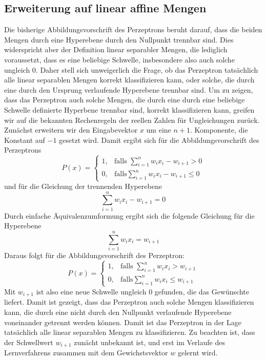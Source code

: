 \documentclass[fontsize=11pt]{scrartcl}
\begin{document}
            \subsection{Erweiterung auf linear affine Mengen}
                Die bisherige Abbildungsvorschrift des Perzeptrons beruht darauf, dass die beiden Mengen durch eine Hyperebene durch den Nullpunkt trennbar sind. Dies widerspricht aber der Definition linear separabler Mengen, die lediglich voraussetzt, dass es eine beliebige Schwelle, insbesondere also auch solche ungleich $0$. Daher stell sich unweigerlich die Frage, ob das Perzeptron tatsächlich alle linear separablen Mengen korrekt klassifizieren kann, oder solche, die durch eine durch den Ursprung verlaufende Hyperebene trennbar sind. Um zu zeigen, dass das Perzeptron auch solche Mengen, die durch eine durch eine beliebige Schwelle definierte Hyperbene trennbar sind, korrekt klassifizieren kann, greifen wir auf die bekannten Rechenregeln der reellen Zahlen für Ungleichungen zurück.
                Zunächst erweitern wir den Eingabevektor $x$ um eine $n+1$. Komponente, die Konstant auf $-1$ gesetzt wird.
                \newline 
                Damit ergibt sich für die Abbildungsvorschrift des Perzeptrons 
                $$
                    P(x)=\left\{\begin{array}{cl} 1, & \mbox{falls }\sum_{i=1}^nw_ix_i - w_{i+1} > 0\\ 0, & \mbox{falls} \sum_{i=1}^n w_ix_i - w_{i+1} \leq 0 \end{array}\right. 
                $$
                und für die Gleichung der trennenden Hyperebene
                $$
                    \sum_{i=1}^nw_ix_i - w_{i+1} = 0
                $$
                Durch einfache Äquivalenzumformung ergibt sich die folgende Gleichung für die Hyperebene
                    $$
                        \sum_{i=1}^nw_ix_i = w_{i+1}
                    $$
                    Daraus folgt für die Abbildungsvorschrift des Perzeptron:
                    $$
                    P(x)=\left\{\begin{array}{cl} 1, & \mbox{falls }\sum_{i=1}^nw_ix_i > w_{i+1}\\ 0, & \mbox{falls} \sum_{i=1}^n w_ix_i \leq w_{i+1} \end{array}\right. 
                    $$
                    Mit $w_{i+1}$ ist also eine neue Schwelle ungleich $0$ gefunden, die das Gewünschte liefert. Damit ist gezeigt, dass das Perzeptron auch solche Mengen klassifizieren kann, die durch eine nicht durch den Nullpunkt verlaufende Hyperebene voneinander getrennt werden können. Damit ist das Perzeptron in der Lage tatsächlich alle linear separablen Mengen zu klassifizieren.
                    \newline
                    Zu beachten ist, dass der Schwellwert $w_{i+1}$ zunächt unbekannt ist, und erst im Verlaufe des Lernverfahrens zusammen mit dem Gewichstsvektor $w$ gelernt wird.
\end{document}
